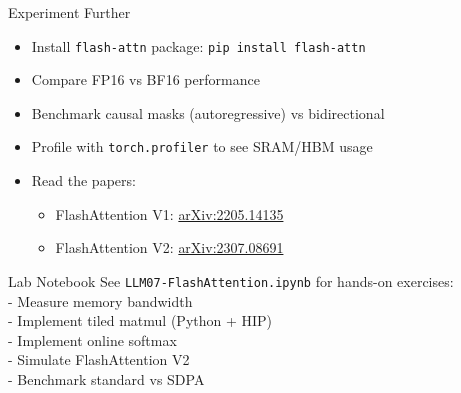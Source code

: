 \documentclass[aspectratio=169,10pt]{beamer}
\begin{document}
\begin{frame}{Experiment Further}
    \begin{itemize}
        \item Install \texttt{flash-attn} package: \texttt{pip install flash-attn}
        \item Compare FP16 vs BF16 performance
        \item Benchmark causal masks (autoregressive) vs bidirectional
        \item Profile with \texttt{torch.profiler} to see SRAM/HBM usage
        \item Read the papers:
        \begin{itemize}
            \item FlashAttention V1: \href{https://arxiv.org/abs/2205.14135}{arXiv:2205.14135}
            \item FlashAttention V2: \href{https://arxiv.org/abs/2307.08691}{arXiv:2307.08691}
        \end{itemize}
    \end{itemize}

    \vspace{0.5cm}
    \begin{block}{Lab Notebook}
        See \texttt{LLM07-FlashAttention.ipynb} for hands-on exercises: \\
        - Measure memory bandwidth \\
        - Implement tiled matmul (Python + HIP) \\
        - Implement online softmax \\
        - Simulate FlashAttention V2 \\
        - Benchmark standard vs SDPA
    \end{block}

\end{frame}
\end{document}
